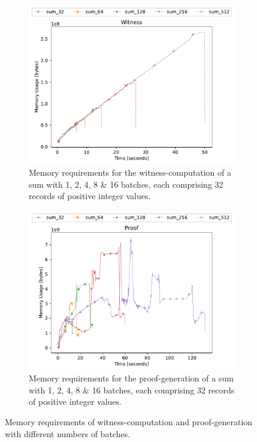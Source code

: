 \begin{figure}[h]
    \centering
    \begin{subfigure}[t]{0.49\textwidth}
        \centering
        \includegraphics[width=1\textwidth]{benchmarks/witness.pdf}
        \caption{Memory requirements for the witness-computation of a sum with 1, 2, 4, 8 \& 16 batches, each comprising 32 records of positive integer values.}
        \label{fig:y equals x}
    \end{subfigure}
    \hfill
    \begin{subfigure}[t]{0.49\textwidth}
        \centering
        \includegraphics[width=1\textwidth]{benchmarks/proof.pdf}
        \caption{Memory requirements for the proof-generation of a sum with 1, 2, 4, 8 \& 16 batches, each comprising 32 records of positive integer values.}
        \label{fig:y equals x}
    \end{subfigure}
    \caption{Memory requirements of witness-computation and proof-generation with different numbers of batches.}
    \label{fig:proving-phase}
\end{figure}

